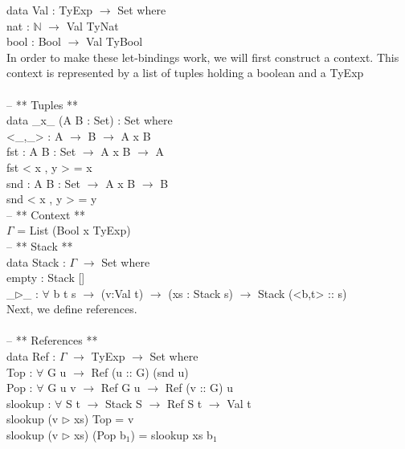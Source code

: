 \documentclass[paper=a4, fontsize=11pt]{scrartcl} %
\numberwithin{equation}{section} %
\numberwithin{figure}{section} %
\numberwithin{table}{section} %
\begin{document}
data Val : TyExp $\rightarrow$ Set where\\
  nat : $\mathbb{N}$ $\rightarrow$ Val TyNat\\
  bool : Bool $\rightarrow$ Val TyBool\\
\normalfont
In order to make these let-bindings work, we will first construct a context. This context is represented by a list of tuples holding a boolean and a TyExp \\
\ttfamily
\\
-- ** Tuples **\\

data \_x\_ (A B : Set) : Set where\\
  <\_,\_> : A $\rightarrow$ B $\rightarrow$ A x B\\

fst : {A B : Set} $\rightarrow$ A x B $\rightarrow$ A\\
fst < x , y > = x\\

snd : {A B : Set} $\rightarrow$ A x B $\rightarrow$ B\\
snd < x , y > = y\\

-- ** Context **\\

$\Gamma$ = List (Bool x TyExp)\\

-- ** Stack **\\

data Stack : $\Gamma$ $\rightarrow$ Set where\\
  empty : Stack []\\
  \_$\rhd$\_ : $\forall$ {b t s} $\rightarrow$ (v:Val t) $\rightarrow$ (xs : Stack s) $\rightarrow$ Stack (<b,t> :: s)\\
  
\normalfont
Next, we define references.\\
\ttfamily
\\
-- ** References **\\

data Ref : $\Gamma$ $\rightarrow$ TyExp $\rightarrow$ Set where\\
 Top : $\forall$ {G u} $\rightarrow$ Ref (u :: G) (snd u)\\
 Pop : $\forall$ {G u v} $\rightarrow$ Ref G u $\rightarrow$ Ref (v :: G) u\\

slookup : $\forall$ {S t} $\rightarrow$ Stack S $\rightarrow$ Ref S t $\rightarrow$ Val t\\
slookup (v $\rhd$ xs) Top = v\\
slookup (v $\rhd$ xs) (Pop b$_1$) = slookup xs b$_1$\\
\end{document}
